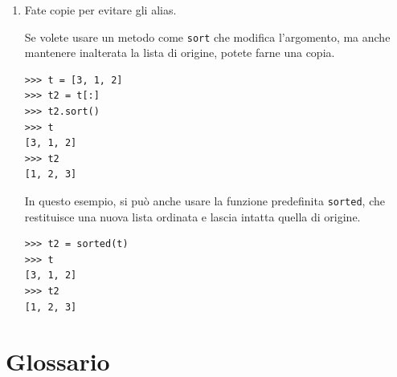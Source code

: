 \documentclass[10pt]{book}
\begin{document}
\begin{enumerate}
\item Fate copie per evitare gli alias.

Se volete usare un metodo come {\tt sort} che modifica l'argomento, ma anche mantenere inalterata la lista di origine, potete farne una copia.

\begin{verbatim}
>>> t = [3, 1, 2]
>>> t2 = t[:]
>>> t2.sort()
>>> t
[3, 1, 2]
>>> t2
[1, 2, 3]
\end{verbatim}

In questo esempio, si può anche usare la funzione predefinita {\tt sorted},
che restituisce una nuova lista ordinata e lascia intatta quella di origine.

\begin{verbatim}
>>> t2 = sorted(t)
>>> t
[3, 1, 2]
>>> t2
[1, 2, 3]
\end{verbatim}

\end{enumerate}


\section{Glossario}
\end{document}
